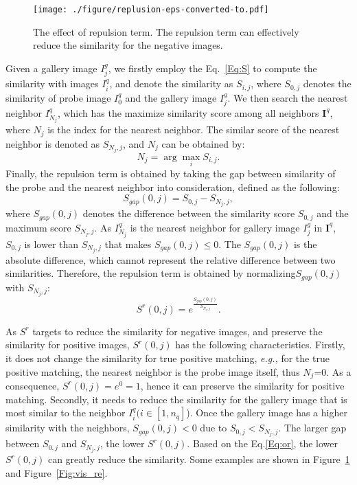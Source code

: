 \documentclass[journal]{IEEEtran}
\begin{document}
\begin{figure}
\texttt{[image: ./figure/replusion-eps-converted-to.pdf]}
\caption{The effect of repulsion term. The repulsion term can effectively reduce the similarity for the negative images.}
\label{Fig:repul}
\end{figure}

Given a gallery image $I^{g}_{j}$, we firstly employ the Eq.~\eqref{Eq:S} to compute the similarity with images $I^{q}_{i}$, and denote the similarity as $S_{i,j}$, where $S_{0,j}$ denotes the similarity of probe image $I^{q}_{0}$ and the gallery image $I^{g}_{j}$. 
We then search the nearest neighbor $I^{q}_{N_j}$, which has the maximize similarity score among all neighbors $\boldsymbol{I}^{q}$, where $N_j$ is the index for the nearest neighbor. 
The similar score of the nearest neighbor is denoted as $S_{N_{j},j}$, and $N_j$ can be obtained by:
\begin{equation}
\label{eq:nj}
N_{j}=\arg\max_{i}S_{i,j}.
\end{equation}
Finally, the repulsion term is obtained by taking the gap between similarity of the probe and the nearest neighbor into consideration, defined as the following:
\begin{equation}
S_{gap}(0,j) = S_{0,j}-S_{N_{j},j},
\end{equation}
where $S_{gap}(0,j)$ denotes the difference between the similarity score $S_{0,j}$ and the maximum score $S_{N_{j},j}$. As $I^{q}_{N_j}$ is the nearest neighbor for gallery image $I^{g}_{j}$ in $\boldsymbol{I}^{q}$, $S_{0,j}$ is lower than $S_{N_{j},j}$ that makes $S_{gap}(0,j)\le 0$.  The $S_{gap}(0,j)$ is the absolute difference, which cannot represent the relative difference between two similarities. Therefore,  the repulsion term is obtained by normalizing$S_{gap}(0,j)$ with $S_{N_{j},j}$:
\begin{equation}
\label{Eq:repulsion}
S^{r}(0,j)=e^{\frac{S_{gap}(0,j)}{S_{N_{j},j}}}.
\end{equation}

As $S^{r}$ targets to reduce the similarity for negative images, and preserve the similarity for positive images, $S^{r}(0,j)$ has the following characteristics.
Firstly, it does not change the similarity for true positive matching, \emph{e.g.,} for the true positive matching, the nearest neighbor is the probe image itself, thus $N_{j}$=0. 
As a consequence, $S^{r}(0,j)=e^{0}=1$, hence it can preserve the similarity for positive matching. 
Secondly, it needs to reduce the similarity for the gallery image that is most similar to the neighbor $I^{q}_{i}(i\in[1,n_{q}]$). Once the gallery image has a higher similarity with the neighbors,  $S_{gap}(0,j)<0$ due to $ S_{0,j}<S_{N_{j},j}$. The larger gap between  $ S_{0,j}$ and $S_{N_{j},j}$, the lower $S^{r}(0,j)$. Based on the Eq.\eqref{Eq:or},  the lower $S^{r}(0,j)$ can greatly reduce the similarity. Some examples are shown in Figure~\ref{Fig:repul} and Figure~\ref{Fig:vis_re}.
\end{document}
